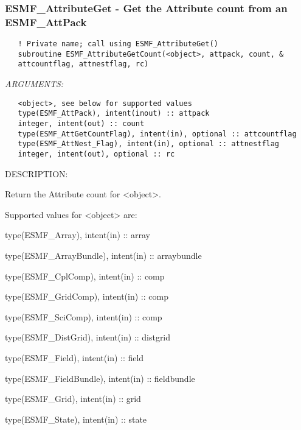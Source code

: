 \subsubsection [ESMF\_AttributeGet] {ESMF\_AttributeGet - Get the Attribute count from an ESMF\_AttPack}


  
\begin{verbatim}   ! Private name; call using ESMF_AttributeGet()
   subroutine ESMF_AttributeGetCount(<object>, attpack, count, &
   attcountflag, attnestflag, rc)\end{verbatim}{\em ARGUMENTS:}
\begin{verbatim}   <object>, see below for supported values
   type(ESMF_AttPack), intent(inout) :: attpack
   integer, intent(out) :: count
   type(ESMF_AttGetCountFlag), intent(in), optional :: attcountflag
   type(ESMF_AttNest_Flag), intent(in), optional :: attnestflag
   integer, intent(out), optional :: rc\end{verbatim}
{\sf DESCRIPTION:\\ }


   Return the Attribute count for <object>.
  
   Supported values for <object> are:
   \begin{description}
   \item type(ESMF\_Array), intent(in) :: array
   \item type(ESMF\_ArrayBundle), intent(in) :: arraybundle
   \item type(ESMF\_CplComp), intent(in) :: comp
   \item type(ESMF\_GridComp), intent(in) :: comp
   \item type(ESMF\_SciComp), intent(in) :: comp
   \item type(ESMF\_DistGrid), intent(in) :: distgrid
   \item type(ESMF\_Field), intent(in) :: field
   \item type(ESMF\_FieldBundle), intent(in) :: fieldbundle
   \item type(ESMF\_Grid), intent(in) :: grid
   \item type(ESMF\_State), intent(in) :: state
   \end{description}
  
